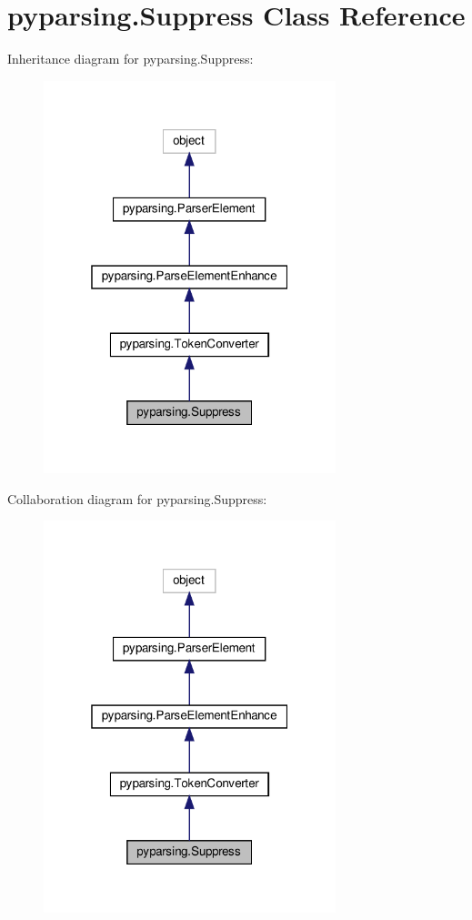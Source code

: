 \hypertarget{classpyparsing_1_1Suppress}{}\section{pyparsing.\+Suppress Class Reference}
\label{classpyparsing_1_1Suppress}


Inheritance diagram for pyparsing.\+Suppress\+:
\nopagebreak
\begin{figure}[H]
\begin{center}
\leavevmode
\includegraphics[width=241pt]{classpyparsing_1_1Suppress__inherit__graph}
\end{center}
\end{figure}


Collaboration diagram for pyparsing.\+Suppress\+:
\nopagebreak
\begin{figure}[H]
\begin{center}
\leavevmode
\includegraphics[width=241pt]{classpyparsing_1_1Suppress__coll__graph}
\end{center}
\end{figure}
